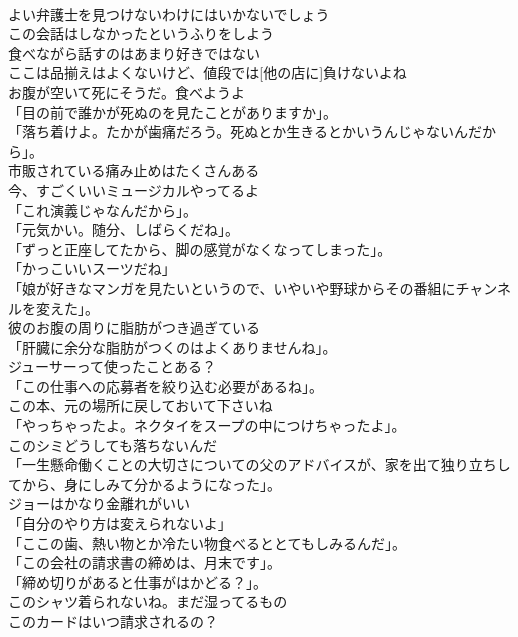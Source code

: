 \documentclass[8pt]{extreport}
\begin{document}
\begin{CJK}{UTF8}{min}
\\	よい弁護士を見つけないわけにはいかないでしょう	
\\	この会話はしなかったというふりをしよう	
\\	食べながら話すのはあまり好きではない	
\\	ここは品揃えはよくないけど、値段では[他の店に]負けないよね	
\\	お腹が空いて死にそうだ。食べようよ	
\\	「目の前で誰かが死ぬのを見たことがありますか」。	
\\	「落ち着けよ。たかが歯痛だろう。死ぬとか生きるとかいうんじゃないんだから」。	
\\	市販されている痛み止めはたくさんある	
\\	今、すごくいいミュージカルやってるよ	
\\	「これ演義じゃなんだから」。	
\\	「元気かい。随分、しばらくだね」。	
\\	「ずっと正座してたから、脚の感覚がなくなってしまった」。	
\\	「かっこいいスーツだね」	
\\	「娘が好きなマンガを見たいというので、いやいや野球からその番組にチャンネルを変えた」。	
\\	彼のお腹の周りに脂肪がつき過ぎている	
\\	「肝臓に余分な脂肪がつくのはよくありませんね」。	
\\	ジューサーって使ったことある？	
\\	「この仕事への応募者を絞り込む必要があるね」。	
\\	この本、元の場所に戻しておいて下さいね	
\\	「やっちゃったよ。ネクタイをスープの中につけちゃったよ」。	
\\	このシミどうしても落ちないんだ	
\\	「一生懸命働くことの大切さについての父のアドバイスが、家を出て独り立ちしてから、身にしみて分かるようになった」。	
\\	ジョーはかなり金離れがいい	
\\	「自分のやり方は変えられないよ」	
\\	「ここの歯、熱い物とか冷たい物食べるととてもしみるんだ」。	
\\	「この会社の請求書の締めは、月末です」。	
\\	「締め切りがあると仕事がはかどる？」。	
\\	このシャツ着られないね。まだ湿ってるもの	
\\	このカードはいつ請求されるの？	

\end{CJK}
\end{document}
